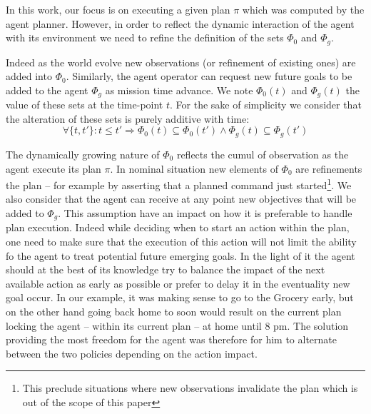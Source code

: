  
In this work, our focus is on executing a given plan $\pi$ which was
computed by the agent planner. However, in order to reflect the
dynamic interaction of the agent with its environment we need to
refine the definition of the sets $\Phi_0$ and $\Phi_g$. 

Indeed as the world evolve new observations (or refinement of
existing ones) are added into $\Phi_0$. Similarly, the agent operator
can request new future goals to be added to the agent $\Phi_g$ as
mission time advance. We note $\Phi_0(t)$ and $\Phi_g(t)$ the value 
of these sets at the time-point $t$. For the sake of simplicity we
 consider that the alteration of these sets is purely additive with
 time:
\[ \forall \{t, t'\}: t \le t' \Rightarrow \Phi_0(t) \subseteq \Phi_0(t')
\wedge \Phi_g(t) \subseteq \Phi_g(t') \] 

The dynamically growing nature of $\Phi_0$ reflects the cumul of
observation as the agent execute its plan $\pi$. In nominal 
situation new elements of $\Phi_0$ are refinements the plan 
-- for example by asserting that a planned command just
started\footnote{This preclude situations where new observations
  invalidate the plan which is out of the scope of this paper}. We
also consider that the agent can receive at any point new objectives
that will be added to $\Phi_g$. This assumption have an impact on how
it is preferable to handle plan execution. Indeed while deciding
when to start an action within the plan, one need to make  sure that
the execution of this action will not limit the ability fo the agent
to treat potential future emerging goals. In the light of it the agent
should at the best of its knowledge  try to balance the impact of the
next available action as early as possible or prefer to delay it in
the eventuality new goal occur. In our example, it was making sense to
go to the Grocery early, but on the other hand going back home to soon
would result on the current plan locking the agent -- within its current
plan -- at home until 8 pm. The solution providing the most freedom for
the agent was therefore for him to alternate between the two policies
depending on the action impact. 

